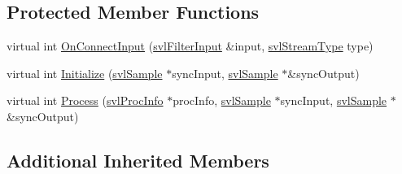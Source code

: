 \subsection*{Protected Member Functions}
\begin{DoxyCompactItemize}
\item 
virtual int \hyperlink{classsvl_filter_image_blob_detector_a6cdb91438077d3bce56ae08d77886a9d}{On\-Connect\-Input} (\hyperlink{classsvl_filter_input}{svl\-Filter\-Input} \&input, \hyperlink{svl_definitions_8h_aa00696d338a58db361335a01fd11e122}{svl\-Stream\-Type} type)
\item 
virtual int \hyperlink{classsvl_filter_image_blob_detector_a96999544fdd04227b35fbfa0cbdcb664}{Initialize} (\hyperlink{classsvl_sample}{svl\-Sample} $\ast$sync\-Input, \hyperlink{classsvl_sample}{svl\-Sample} $\ast$\&sync\-Output)
\item 
virtual int \hyperlink{classsvl_filter_image_blob_detector_ae9efe50f3b9de886af3cc0cfabcc05ac}{Process} (\hyperlink{structsvl_proc_info}{svl\-Proc\-Info} $\ast$proc\-Info, \hyperlink{classsvl_sample}{svl\-Sample} $\ast$sync\-Input, \hyperlink{classsvl_sample}{svl\-Sample} $\ast$\&sync\-Output)
\end{DoxyCompactItemize}
\subsection*{Additional Inherited Members}


